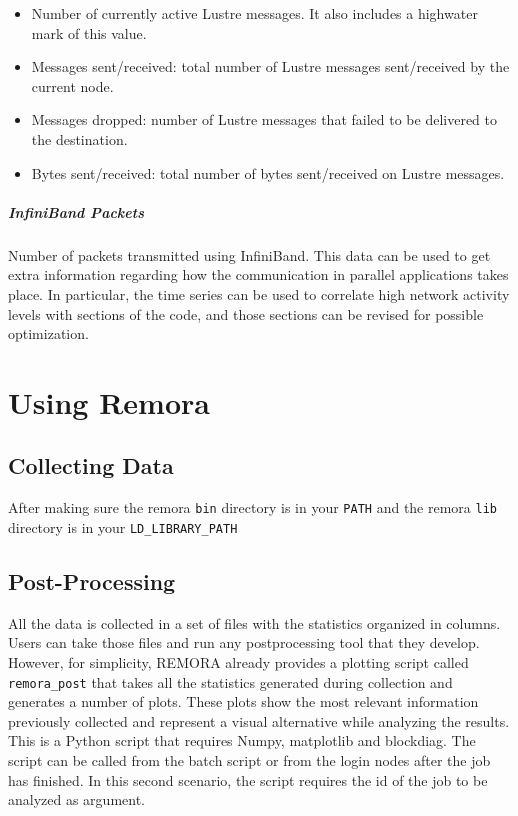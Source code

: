 \documentclass[10pt,a4paper]{report}
\begin{document}
\begin{itemize}
\item Number of currently active Lustre messages. It also includes a highwater mark of this value.
\item Messages sent/received: total number of Lustre messages sent/received by the current node.
\item Messages dropped: number of Lustre messages that failed to be delivered to the destination.
\item Bytes sent/received: total number of bytes sent/received on Lustre messages.
\end{itemize}


\paragraph{InfiniBand Packets}
Number of packets transmitted using InfiniBand. This data can be used to get extra information regarding how the communication in parallel applications takes place. In particular, the time series can be used to correlate high network activity levels with sections of the code, and those sections can be revised for possible optimization.

\FloatBarrier
\chapter{Using Remora}

\section{Collecting Data}
After making sure the remora \verb+bin+ directory is in your \verb+PATH+ and the remora \verb+lib+ directory is in your \verb|LD_LIBRARY_PATH|

\section{Post-Processing}
All the data is collected in a set of files with the statistics organized in columns. Users can take those files and run any postprocessing tool that they develop. However, for simplicity, REMORA already provides a plotting script called \verb+remora_post+ that takes all the statistics generated during collection and generates a number of plots. These plots show the most relevant information previously collected and represent a visual alternative while analyzing the results. This is a Python script that requires Numpy, matplotlib and blockdiag. The script can be called from the batch script or from the login nodes after the job has finished. In this second scenario, the script requires the id of the job to be analyzed as argument.
\end{document}
